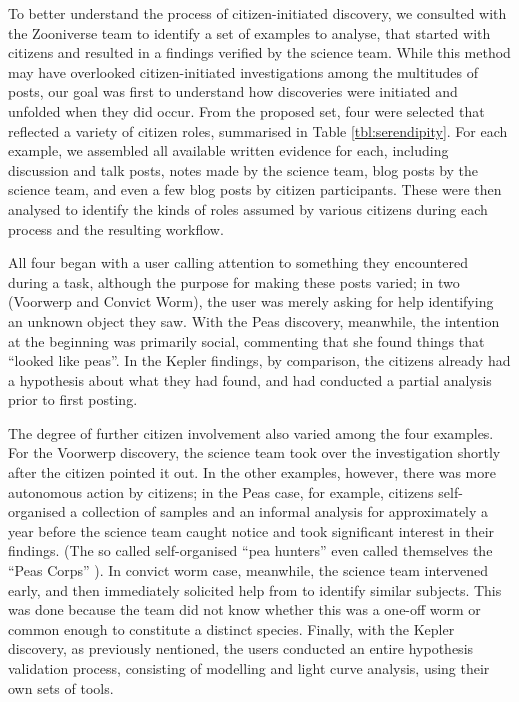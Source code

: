 \documentclass{sigchi}
\begin{document}
To better understand the process of citizen-initiated discovery, we consulted with the Zooniverse team to identify a set of examples to analyse, that started with citizens and resulted in a findings verified by the science team.  While this method may have overlooked citizen-initiated investigations among the multitudes of posts, our goal was first to understand how discoveries were initiated and unfolded when they did occur.  From the proposed set, four were selected that reflected a variety of citizen roles, summarised in Table \ref{tbl:serendipity}. For each example, we assembled all available written evidence for each, including discussion and talk posts, notes made by the science team, blog posts by the science team, and even a few blog posts by citizen participants.  These were then analysed to identify the kinds of roles assumed by various citizens during each process and the resulting workflow.

All four began with a user calling attention to something they encountered during a task, although the purpose for making these posts varied; in two (Voorwerp and Convict Worm), the user was merely asking for help identifying an unknown object they saw.  With the Peas discovery, meanwhile, the intention at the beginning was primarily social, commenting that she found things that ``looked like peas''.  In the Kepler findings, by comparison, the citizens already had a hypothesis about what they had found, and had conducted a partial analysis prior to first posting.

The degree of further citizen involvement also varied among the four examples. For the Voorwerp discovery, the science team took over the investigation shortly after the citizen pointed it out. In the other examples, however, there was more autonomous action by citizens; in the Peas case, for example, citizens self-organised a collection of samples and an informal analysis for approximately a year before the science team caught notice and took significant interest in their findings.  (The so called self-organised ``pea hunters'' even called themselves the  ``Peas Corps'' \cite{story-of-the-peas}).  In convict worm case, meanwhile, the science team intervened early, and then immediately solicited help from to identify similar subjects.  This was done because the team did not know whether this was a one-off worm or common enough to constitute a distinct species. Finally, with the Kepler discovery, as previously nentioned, the users conducted an entire hypothesis validation process, consisting of modelling and light curve analysis, using their own sets of tools.
\end{document}
